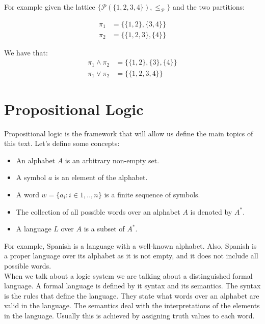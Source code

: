 For example given the lattice $\{\mathcal{P}(\{1,2,3,4\}),\le_{\mathcal{P}}\}$ and the two partitions:

\begin{equation}
    \begin{split}
      \pi_1 & = \{\{1,2\},\{3,4\}\}\\
      \pi_2 & = \{\{1,2,3\},\{4\}\}
\end{split}
\end{equation}

We have that:
\begin{equation}
    \begin{split}
      \pi_1\land\pi_2 & = \{\{1,2\},\{3\},\{4\}\}\\
      \pi_1\lor\pi_2 & = \{\{1,2,3,4\}\}
\end{split}
\end{equation}



  
\section{Propositional Logic}
Propositional logic is the framework that will allow us define the main topics of this text.  Let's define some concepts:
\begin{itemize}
\item An alphabet $A$ is an arbitrary non-empty set.
\item A symbol $a$ is an element of the alphabet.
\item A word $w = \{a_i:i\in 1,..,n\}$ is a finite sequence of symbols.
\item The collection of all possible words over an alphabet $A$ is denoted by $A^*$.
\item A language $L$ over $A$ is a subset of $A^*$.
\end{itemize}

For example, Spanish is a language with a well-known alphabet. Also, Spanish is a proper language over its alphabet as it is not empty, and it does not include all possible words.\\

When we talk about a logic system we are talking about a distinguished formal language. A formal language is defined by it syntax and its semantics. The syntax is the rules that define the language. They state what words over an alphabet are valid in the language. The semantics deal with the interpretations of the elements in the language. Usually this is achieved by assigning truth values to each word.\\

